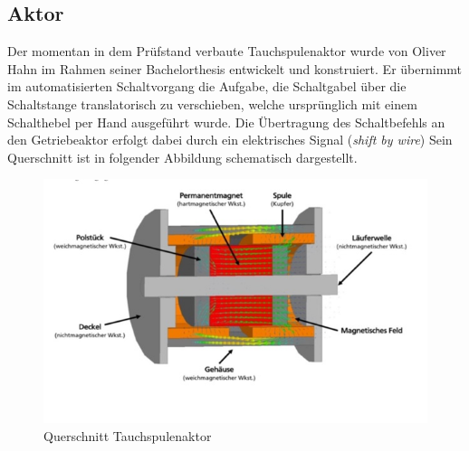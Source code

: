 \subsection{Aktor}

Der momentan in dem Prüfstand verbaute Tauchspulenaktor wurde von Oliver Hahn im Rahmen seiner Bachelorthesis entwickelt und konstruiert. Er übernimmt im automatisierten Schaltvorgang die Aufgabe, die Schaltgabel  über die Schaltstange translatorisch zu verschieben, welche ursprünglich mit einem Schalthebel per Hand ausgeführt wurde. Die Übertragung des Schaltbefehls an den Getriebeaktor erfolgt dabei durch ein elektrisches Signal (\textit{shift by wire})
Sein Querschnitt ist in folgender Abbildung schematisch dargestellt.

\begin{figure}[h]
	\centering
		\includegraphics{Bilder/Querschnitt Aktor.jpg}
	\caption{Querschnitt Tauchspulenaktor \cite[S.30]{Hahn2018}}
	\label{fig:Querschnitt Aktor}
\end{figure}

